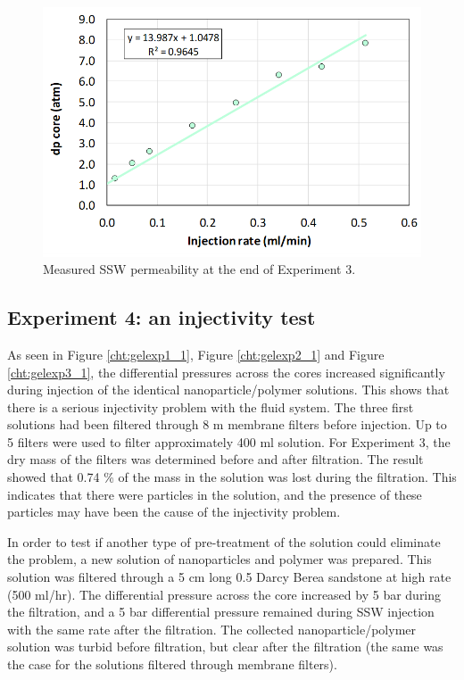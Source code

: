 \begin{figure}[h!]
    \centering
    \includegraphics[width=\textwidth]{img/cht/gelexp3_4.png}
    \caption{Measured SSW permeability at the end of Experiment 3.}
    \label{cht:gelexp3_4} %
\end{figure}

\FloatBarrier
\subsection{Experiment 4: an injectivity test}
As seen in Figure \ref{cht:gelexp1_1}, Figure \ref{cht:gelexp2_1} and Figure \ref{cht:gelexp3_1}, the differential pressures across the cores increased significantly during injection of the identical nanoparticle/polymer solutions. This shows that there is a serious injectivity problem with the fluid system. The three first solutions had been filtered through 8 \micro m membrane filters before injection. Up to 5 filters were used to filter approximately 400 ml solution. For Experiment 3, the dry mass of the filters was determined before and after filtration. The result showed that 0.74 \% of the mass in the solution was lost during the filtration. This indicates that there were particles in the solution, and the presence of these particles may have been the cause of the injectivity problem.

In order to test if another type of pre-treatment of the solution could eliminate the problem, a new solution of nanoparticles and polymer was prepared. This solution was filtered through a 5 cm long 0.5 Darcy Berea sandstone at high rate (500 ml/hr). The differential pressure across the core increased by 5 bar during the filtration, and a 5 bar differential pressure remained during SSW injection with the same rate after the filtration. The collected nanoparticle/polymer solution was turbid before filtration, but clear after the filtration (the same was the case for the solutions filtered through membrane filters).

